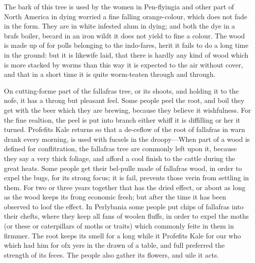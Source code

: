 \documentclass{article}
\begin{document}
The bark of this tree is used by the women in Pen-flyingia and other part of North America in dying worried a fine falling orange-colour, which does not fade in the form. They are in white infested alum in dying; and both the dye in a brafs boiler, becard in an iron wildt it does not yield to fine a colour. The wood is made up of for polls belonging to the indo-fares, herit it fails to do a long time in the ground: but it is likewife laid, that there is hardly any kind of wood which is more stacked by worms than this way it is expected to the air without cover, and that in a short time it is quite worm-teaten through and through.

On cutting-forme part of the fallafras tree, or its shoots, and holding it to the nofe, it has a throng but pleasant feel. Some people peel the root, and boil they get with the beer which they are brewing, because they believe it wishfulness. For the fine realtion, the peel is put into branch either whiff it is diffilling or her it turned. Profefits Kale returns so that a de-ceflow of the root of fallafras in warn drank every morning, is used with fucsels in the droopy—When part of a wood is defined for conflitration, the fallafras tree are commonly left upon it, because they say a very thick foliage, and afford a cool finish to the cattle during the great heats. Some people get their bel-pulle made of fallafras wood, in order to expel the bugs, for its strong focus; it is fail, prevents those verin from settling in them. For two or three years together that has the dried effect, or about as long as the wood keeps its frong economic fresh; but after the time it has been observed to loof the effect. In Perlybania some people put chips of fallafras into their chefts, where they keep all fans of woolen fluffs, in order to expel the moths (or these or caterpillars of moths or traits) which commonly feite in them in firmmer. The root keeps its smell for a long while it Profefits Kale for our who which had him for ofx yers in the drawn of a table, and full preferred the strength of its feces. The people also gather its flowers, and uile it acts.
\end{document}
